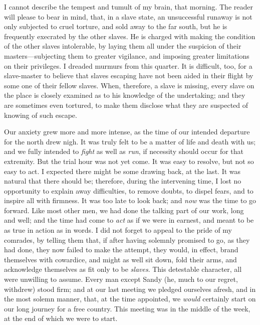 {}I cannot describe the tempest and tumult of my brain, that morning.
The reader will please to bear in mind, that, in a slave state, an
unsuccessful runaway is not only subjected to cruel torture, and sold
away to the far south, but he is frequently execrated by the other
slaves. He is charged with making the condition of the other slaves
intolerable, by laying them all under the suspicion of their
masters---subjecting them to greater vigilance, and imposing greater
limitations on their privileges. I dreaded murmurs from this quarter. It
is difficult, too, for a slave-master to believe that slaves escaping
have not been aided in their flight by some one of their fellow slaves.
When, therefore, a slave is missing, every slave on the place is closely
examined as to his knowledge of the undertaking; and they are sometimes
even tortured, to make them disclose what they are suspected of knowing
of such escape.

Our anxiety grew more and more intense, as the time of our intended
departure for the north drew nigh. It was truly felt to be a matter of
life and death with us; and we fully intended to \emph{fight} as well as
\emph{run}, if necessity should occur for that extremity. But the trial
hour was not yet come. It was easy to resolve, but not so easy to act. I
expected there might be some drawing back, at the last. It was natural
that there should be; therefore, during the intervening time, I lost no
opportunity to explain away difficulties, to remove doubts, to dispel
fears, and to inspire all with firmness. It was too late to look back;
and \emph{now} was the time to go forward. Like most other men, we had
done the talking part {}of our work, long and well; and the time had
come to \emph{act} as if we were in earnest, and meant to be as true in
action as in words. I did not forget to appeal to the pride of my
comrades, by telling them that, if after having solemnly promised to go,
as they had done, they now failed to make the attempt, they would, in
effect, brand themselves with cowardice, and might as well sit down,
fold their arms, and acknowledge themselves as fit only to be
\emph{slaves}. This detestable character, all were unwilling to assume.
Every man except Sandy (he, much to our regret, withdrew) stood firm;
and at our last meeting we pledged ourselves afresh, and in the most
solemn manner, that, at the time appointed, we \emph{would} certainly
start on our long journey for a free country. This meeting was in the
middle of the week, at the end of which we were to start.


